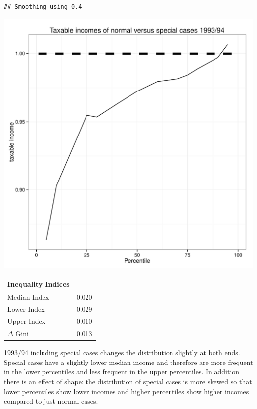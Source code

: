 \documentclass[twoside]{article}\usepackage[]{graphicx}\usepackage[]{color}
\makeatletter
\def\maxwidth{ %
  \ifdim\Gin@nat@width>\linewidth
    \linewidth
  \else
    \Gin@nat@width
  \fi
}
\newenvironment{kframe}{%
 \def\at@end@of@kframe{}%
 \ifinner\ifhmode%
  \def\at@end@of@kframe{\end{minipage}}%
  \begin{minipage}{\columnwidth}%
 \fi\fi%
 \def\FrameCommand##1{\hskip\@totalleftmargin \hskip-\fboxsep
 \colorbox{shadecolor}{##1}\hskip-\fboxsep
     \hskip-\linewidth \hskip-\@totalleftmargin \hskip\columnwidth}%
 \MakeFramed {\advance\hsize-\width
   \@totalleftmargin\z@ \linewidth\hsize
   \@setminipage}}%
 {\par\unskip\endMakeFramed%
 \at@end@of@kframe}
\newenvironment{knitrout}{}{} %
\makeatother
\begin{document}
\begin{multicols}{2}
\begin{knitrout}
\color{fgcolor}\begin{kframe}
\begin{verbatim}
## Smoothing using 0.4
\end{verbatim}
\end{kframe}
\includegraphics[width=\maxwidth]{figure/specialcases9394} 

\end{knitrout}

%
\begin{center}
\begin{tabular}{ll}
\hline\hline
\multicolumn{1}{l}{Inequality Indices}&\multicolumn{1}{c}{}\tabularnewline
\hline
Median Index&0.020\tabularnewline
Lower Index&0.029\tabularnewline
Upper Index&0.010\tabularnewline
$\Delta$ Gini&0.013\tabularnewline
\hline
\end{tabular}
\end{center}



1993/94 including special cases changes the distribution slightly at both ends. Special cases have a slightly lower median income and therefore are more frequent in the lower percentiles and less frequent in the upper percentiles. In addition there is an effect of shape: the distribution of special cases is more skewed so that lower percentiles show lower incomes and higher percentiles show higher incomes compared to just normal cases.


\end{multicols}
\end{document}
